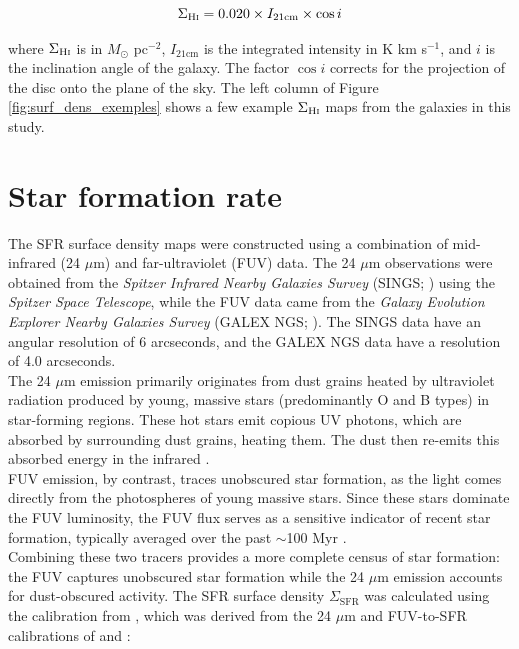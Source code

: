 \begin{equation}
	\Sigma_{\textrm{H\textsc{i}}} = 0.020 \times I_{21\mathrm{cm}} \times \cos i 
	\label{eq:mom0_HI}
\end{equation}

\noindent where $\Sigma_{\textrm{H\textsc{i}}}$ is in $M_\odot$ pc$^{-2}$, $I_{21\mathrm{cm}}$ is the integrated intensity in K km s$^{-1}$, and $i$ is the inclination angle of the galaxy. The factor $\cos i$ corrects for the projection of the disc onto the plane of the sky. The left column of Figure \ref{fig:surf_dens_exemples} shows a few example $\Sigma_{\textrm{H\textsc{i}}}$ maps from the galaxies in this study.


\section{Star formation rate}

The SFR surface density maps were constructed using a combination of mid-infrared (24 $\mu$m) and far-ultraviolet (FUV) data. The 24 $\mu$m observations were obtained from the \textit{Spitzer Infrared Nearby Galaxies Survey} (SINGS; \citealt{sings2003}) using the \textit{Spitzer Space Telescope}, while the FUV data came from the \textit{Galaxy Evolution Explorer Nearby Galaxies Survey} (GALEX NGS; \citealt{galex2007}). The SINGS data have an angular resolution of 6 arcseconds, and the GALEX NGS data have a resolution of 4.0 arcseconds.\\\indent
The 24 $\mu$m emission primarily originates from dust grains heated by ultraviolet radiation produced by young, massive stars (predominantly O and B types) in star-forming regions. These hot stars emit copious UV photons, which are absorbed by surrounding dust grains, heating them. The dust then re-emits this absorbed energy in the infrared \citep{calzetti2007}.\\\indent
FUV emission, by contrast, traces unobscured star formation, as the light comes directly from the photospheres of young massive stars. Since these stars dominate the FUV luminosity, the FUV flux serves as a sensitive indicator of recent star formation, typically averaged over the past $\sim$100 Myr \citep{salim2007}.\\\indent
Combining these two tracers provides a more complete census of star formation: the FUV captures unobscured star formation while the 24 $\mu$m emission accounts for dust-obscured activity. The SFR surface density $\Sigma_{\mathrm{SFR}}$ was calculated using the calibration from \citet{Leroy2008}, which was derived from the 24 $\mu$m and FUV-to-SFR calibrations of \citet{calzetti2007} and \citet{salim2007}:

